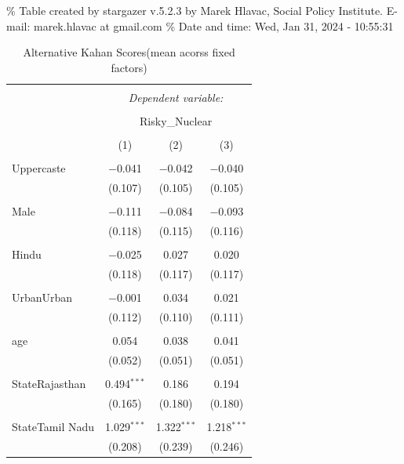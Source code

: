\documentclass[
]{article}
\begin{document}
\newpage

\begingroup\setlength{\tabcolsep}{1pt}

\renewcommand{\arraystretch}{0.7}

\% Table created by stargazer v.5.2.3 by Marek Hlavac, Social Policy
Institute. E-mail: marek.hlavac at gmail.com \% Date and time: Wed, Jan
31, 2024 - 10:55:31

\begin{table}[!htbp] \centering 
  \caption{Alternative Kahan Scores(mean acorss fixed factors)} 
  \label{} 
\begin{tabular}{@{\extracolsep{5pt}}lccc} 
\\[-1.8ex]\hline 
\hline \\[-1.8ex] 
 & \multicolumn{3}{c}{\textit{Dependent variable:}} \\ 
\cline{2-4} 
\\[-1.8ex] & \multicolumn{3}{c}{Risky\_Nuclear} \\ 
\\[-1.8ex] & (1) & (2) & (3)\\ 
\hline \\[-1.8ex] 
 Uppercaste & $-$0.041 & $-$0.042 & $-$0.040 \\ 
  & (0.107) & (0.105) & (0.105) \\ 
  & & & \\ 
 Male & $-$0.111 & $-$0.084 & $-$0.093 \\ 
  & (0.118) & (0.115) & (0.116) \\ 
  & & & \\ 
 Hindu & $-$0.025 & 0.027 & 0.020 \\ 
  & (0.118) & (0.117) & (0.117) \\ 
  & & & \\ 
 UrbanUrban & $-$0.001 & 0.034 & 0.021 \\ 
  & (0.112) & (0.110) & (0.111) \\ 
  & & & \\ 
 age & 0.054 & 0.038 & 0.041 \\ 
  & (0.052) & (0.051) & (0.051) \\ 
  & & & \\ 
 StateRajasthan & 0.494$^{***}$ & 0.186 & 0.194 \\ 
  & (0.165) & (0.180) & (0.180) \\ 
  & & & \\ 
 StateTamil Nadu & 1.029$^{***}$ & 1.322$^{***}$ & 1.218$^{***}$ \\ 
  & (0.208) & (0.239) & (0.246) \\ 

\end{tabular}
\end{table}
\end{document}
